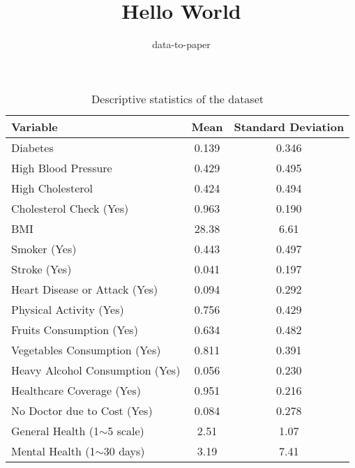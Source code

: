 \documentclass[12pt]{article}
\title{Hello World}
\author{data-to-paper}
\begin{document}
\maketitle

\begin{table}[!htbp]
\centering
\caption{Descriptive statistics of the dataset}
\label{table1}
\begin{tabular}{l c c}
\toprule
\textbf{Variable}                & \textbf{Mean}       & \textbf{Standard Deviation} \\
\midrule
Diabetes                         & 0.139               & 0.346                       \\
High Blood Pressure              & 0.429               & 0.495                       \\
High Cholesterol                 & 0.424               & 0.494                       \\
Cholesterol Check (Yes)          & 0.963               & 0.190                       \\
BMI                              & 28.38               & 6.61                        \\
Smoker (Yes)                     & 0.443               & 0.497                       \\
Stroke (Yes)                     & 0.041               & 0.197                       \\
Heart Disease or Attack (Yes)    & 0.094               & 0.292                       \\
Physical Activity (Yes)          & 0.756               & 0.429                       \\
Fruits Consumption (Yes)         & 0.634               & 0.482                       \\
Vegetables Consumption (Yes)     & 0.811               & 0.391                       \\
Heavy Alcohol Consumption (Yes)  & 0.056               & 0.230                       \\
Healthcare Coverage (Yes)        & 0.951               & 0.216                       \\
No Doctor due to Cost (Yes)      & 0.084               & 0.278                       \\
General Health (1$\sim$5 scale)  & 2.51                & 1.07                        \\
Mental Health (1$\sim$30 days)   & 3.19                & 7.41                        \\

\end{tabular}
\end{table}
\end{document}
